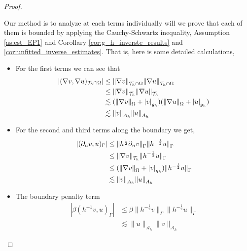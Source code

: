 \begin{proof}
\begin{enumerate}[label=\arabic*)]
    Our method is to analyze at each terms individually will we prove that each of them is bounded by applying the Cauchy-Schwartz inequality, Assumption \ref{as:est_EP1} and Corollary \ref{cor:g_h_inverste_results} and \ref{cor:unfitted_inverse_estimates}. That is, here is some
    detailed calculations,
    \begin{itemize}
        \item For the first terms we can see that \[
\begin{split}
\left\lvert( \nabla v, \nabla u)_{\mathcal{T} _{h} \cap \Omega }  \right\rvert & \le \| \nabla v \|_{ \mathcal{T} _{h}\cap \Omega  }^{  }\| \nabla u \|_{ \mathcal{T} _{h} \cap \Omega  }^{  } \\
& \le \| \nabla v \|_{ \mathcal{T} _{h}  }^{  }\| \nabla u \|_{ \mathcal{T} _{h}   }^{  } \\
        & \lesssim   ( \| \nabla v \|_{ \Omega  }^{  } + \left\lvert  v  \right\rvert _{g_{h}} )( \| \nabla u \|_{ \Omega  }^{  } + \left\lvert  u  \right\rvert _{g_{h}} )\\
        &  \lesssim  \| v \|_{ A_{h} }^{  } \|u  \|_{ A_{h} }^{  }
\end{split}
            \]

        \item For the second and third terms along the boundary we get,
            \[
                \begin{split}
                 \left\lvert ( \partial _{n} v,  u)_{\Gamma } \right\rvert & \le \|h^{\frac{1}{2}} \partial _{n}v  \|_{ \Gamma   }^{  } \| h^{-\frac{1}{2}} u  \|_{ \Gamma  }^{  }  \\
                 & \le \| \nabla v \|_{\mathcal{T}_{h}   }^{  } \|h^{-\frac{1}{2}} u \|_{ \Gamma    }^{  } \\
 &  \le ( \| \nabla v \|_{ \Omega  }^{  } + \left\lvert  v  \right\rvert _{g_{h}} ) \|h^{-\frac{1}{2}} u \|_{ \Gamma    }^{  } \\
                 & \lesssim   \| v \|_{A_{h}   }^{  } \| u \|_{ A_{h}    }^{  }
                \end{split}
            \]

        \item The boundary penalty term
            \[
                \begin{split}
                    \left\lvert\beta ( h^{-1} v,u)_{\Gamma }  \right\rvert  & \le \beta \| h^{-\frac{1}{2}} v \|_{\Gamma   }^{  } \| h^{-\frac{1}{2}} u \|_{\Gamma   }^{  } \\
                                                                            &\lesssim \| u \|_{\mathcal{A}_{h}   }^{  }\| v \|_{\mathcal{A}_{h}   }^{  }
                \end{split}
            \]


\end{itemize}
\end{enumerate}
\end{proof}
